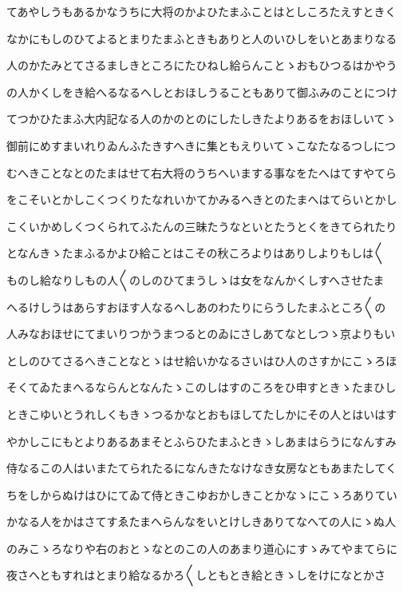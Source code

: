 \documentclass[a4paper,11pt,landscape]{ltjtarticle}
\begin{document}
てあやしうもあるかなうちに大将のかよひたまふことはとしころたえすときく
\par\medskip
なかにもしのひてよるとまりたまふときもありと人のいひしをいとあまりなる
\par\medskip
人のかたみとてさるましきところにたひねし給らんことゝおもひつるはかやう
\par\medskip
の人かくしをき給へるなるへしとおほしうることもありて御ふみのことにつけ
\par\medskip
てつかひたまふ大内記なる人のかのとのにしたしきたよりあるをおほしいてゝ
\par\medskip
御前にめすまいれりゐんふたきすへきに集ともえりいてゝこなたなるつしにつ
\par\medskip
むへきことなとのたまはせて右大将のうちへいまする事なをたへはてすやてら
\par\medskip
をこそいとかしこくつくりたなれいかてかみるへきとのたまへはてらいとかし
\par\medskip
こくいかめしくつくられてふたんの三昧たうなといとたうとくをきてられたり
\par\medskip
となんきゝたまふるかよひ給ことはこその秋ころよりはありしよりもしは〱
\par\medskip
ものし給なりしもの人〱のしのひてまうしゝは女をなんかくしすへさせたま
\par\medskip
へるけしうはあらすおほす人なるへしあのわたりにらうしたまふところ〱の
\par\medskip
人みなおほせにてまいりつかうまつるとのゐにさしあてなとしつゝ京よりもい
\par\medskip
としのひてさるへきことなとゝはせ給いかなるさいはひ人のさすかにこゝろほ
\par\medskip
そくてゐたまへるならんとなんたゝこのしはすのころをひ申すときゝたまひし
\par\medskip
ときこゆいとうれしくもきゝつるかなとおもほしてたしかにその人とはいはす
\par\medskip
やかしこにもとよりあるあまそとふらひたまふときゝしあまはらうになんすみ
\par\medskip
侍なるこの人はいまたてられたるになんきたなけなき女房なともあまたしてく
\par\medskip
ちをしからぬけはひにてゐて侍ときこゆおかしきことかなゝにこゝろありてい
\par\medskip
かなる人をかはさてすゑたまへらんなをいとけしきありてなへての人にゝぬ人
\par\medskip
のみこゝろなりや右のおとゝなとのこの人のあまり道心にすゝみてやまてらに
\par\medskip
夜さへともすれはとまり給なるかろ〱しともとき給ときゝしをけになとかさ
\end{document}
